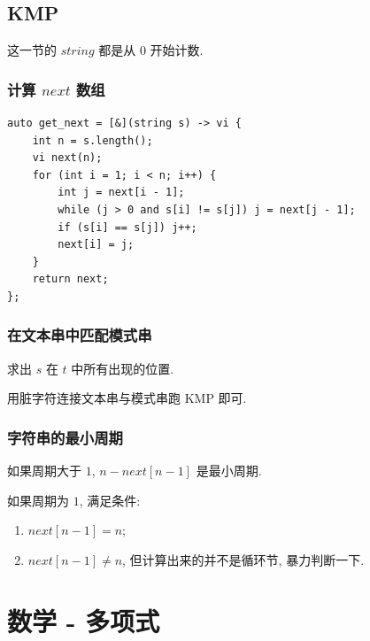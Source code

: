 \documentclass[UTF8, a4paper, titlepage, twoside]{ctexart}
\begin{document}
\subsection{ KMP }

这一节的 $string$ 都是从 $0$ 开始计数. 

\subsubsection{ 计算 $next$ 数组 }
\begin{lstlisting}
auto get_next = [&](string s) -> vi {
    int n = s.length();
    vi next(n);
    for (int i = 1; i < n; i++) {
        int j = next[i - 1];
        while (j > 0 and s[i] != s[j]) j = next[j - 1];
        if (s[i] == s[j]) j++;
        next[i] = j;
    }
    return next;
};
\end{lstlisting}

\subsubsection{ 在文本串中匹配模式串 }
求出 $s$ 在 $t$ 中所有出现的位置.

用脏字符连接文本串与模式串跑 KMP 即可.

\subsubsection{ 字符串的最小周期 }

如果周期大于 $1$, $n - next[n-1]$ 是最小周期.

如果周期为 $1$, 满足条件:

\begin{enumerate}
	\item $next[n-1] = n$;
	\item $next[n-1] \neq n$, 但计算出来的并不是循环节, 暴力判断一下.
\end{enumerate}

\newpage
\section{ 数学 - 多项式 }
\end{document}
